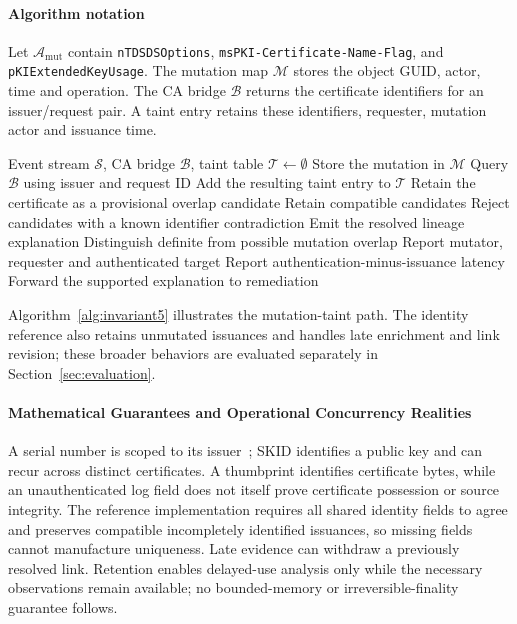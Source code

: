 \paragraph{Algorithm notation}
Let $\mathcal A_{\mathrm{mut}}$ contain \texttt{nTDSDSOptions}, \texttt{msPKI-Certificate-Name-Flag}, and \texttt{pKIExtendedKeyUsage}. The mutation map $\mathcal M$ stores the object GUID, actor, time and operation. The CA bridge $\mathcal B$ returns the certificate identifiers for an issuer/request pair. A taint entry retains these identifiers, requester, mutation actor and issuance time.

\begin{algorithm}[H]
\caption{CIPG certificate-lineage update}
\label{alg:invariant5}
\footnotesize
\begin{algorithmic}[1]
\Require Event stream $\mathcal S$, CA bridge $\mathcal B$, taint table $\mathcal T\gets\emptyset$
  \State Store the mutation in $\mathcal M$
  \State Query $\mathcal B$ using issuer and request ID
  \State Add the resulting taint entry to $\mathcal T$
  \State Retain the certificate as a provisional overlap candidate
  \State Retain compatible candidates
  \State Reject candidates with a known identifier contradiction
   \State Emit the resolved lineage explanation
   \State Distinguish definite from possible mutation overlap
   \State Report mutator, requester and authenticated target
   \State Report authentication-minus-issuance latency
   \State Forward the supported explanation to remediation
  \EndIf
 \EndIf
\EndFor
\end{algorithmic}
\end{algorithm}


Algorithm~\ref{alg:invariant5} illustrates the mutation-taint path. The identity reference also retains unmutated issuances and handles late enrichment and link revision; these broader behaviors are evaluated separately in Section~\ref{sec:evaluation}.

\paragraph{Mathematical Guarantees and Operational Concurrency Realities}
A serial number is scoped to its issuer~\cite{rfc5280}; SKID identifies a public key and can recur across distinct certificates. A thumbprint identifies certificate bytes, while an unauthenticated log field does not itself prove certificate possession or source integrity. The reference implementation requires all shared identity fields to agree and preserves compatible incompletely identified issuances, so missing fields cannot manufacture uniqueness. Late evidence can withdraw a previously resolved link. Retention enables delayed-use analysis only while the necessary observations remain available; no bounded-memory or irreversible-finality guarantee follows.

